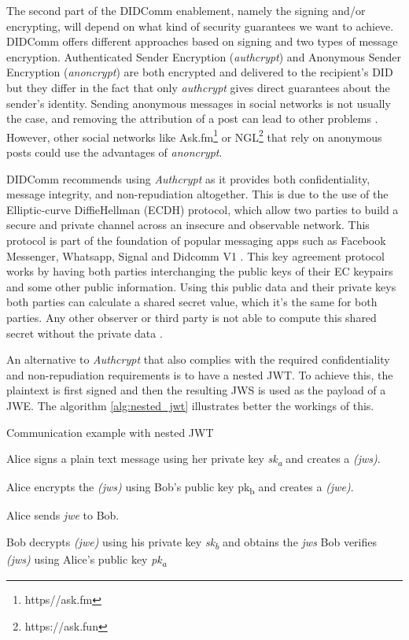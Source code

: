The second part of the DIDComm enablement, namely the signing and/or encrypting, will depend on what kind of security guarantees we want to achieve. DIDComm offers different approaches based on signing and two types of message encryption. Authenticated Sender Encryption (\emph{authcrypt}) and Anonymous Sender Encryption (\emph{anoncrypt}) are both encrypted and delivered to the recipient's DID but they differ in the fact that only \emph{authcrypt} gives direct guarantees about the sender's identity. Sending anonymous messages in social networks is not usually the case, and removing the attribution of a post can lead to other problems \cite{martin_2022}. However, other social networks like Ask.fm\footnote{https//ask.fm} or NGL\footnote{https://ask.fun} that rely on anonymous posts could use the advantages of \emph{anoncrypt}.

DIDComm recommends using \emph{Authcrypt} as it provides both confidentiality, message integrity, and non-repudiation altogether. This is due to the use of the 
Elliptic-curve Diffie\-Hellman (ECDH) protocol, which allow two parties to build a secure and private channel across an insecure and observable network. This protocol is part of the foundation of popular messaging apps such as Facebook Messenger, Whatsapp, Signal and Didcomm V1 \cite{shaaban_2021}. This key agreement protocol works by having both parties interchanging the public keys of their EC keypairs and some other public information. Using this public data and their private keys both parties can calculate a shared secret value, which it's the same for both parties. Any other observer or third party is not able to compute this shared secret without the private data \cite{5972416}. 

An alternative to \emph{Authcrypt} that also complies with the required confidentiality and non-repudiation requirements is to have a nested JWT. To achieve this, the plaintext is first signed and then the resulting JWS is used as the payload of a JWE. The algorithm \ref{alg:nested_jwt} illustrates better the workings of this. 

\begin{algorithm}[H]
  \caption{Communication example with nested JWT}
  \label{alg:nested_jwt}
    \begin{algorithmic}[1]
      \State Alice signs a plain text message using her private key \emph{sk\textsubscript{a}} and creates a \emph{(jws)}.
  
      \State Alice encrypts the \emph{(jws)} using Bob's public key pk\textsubscript{b} and creates a \emph{(jwe)}.
  
      \State Alice sends \emph{jwe} to Bob.
  
      \State Bob decrypts \emph{(jwe)} using his private key \emph{sk\textsubscript{b}} and obtains the \emph{jws}
      \State Bob verifies \emph{(jws)} using Alice's public key \emph{pk\textsubscript{a}}
  \end{algorithmic}
\end{algorithm}
  
